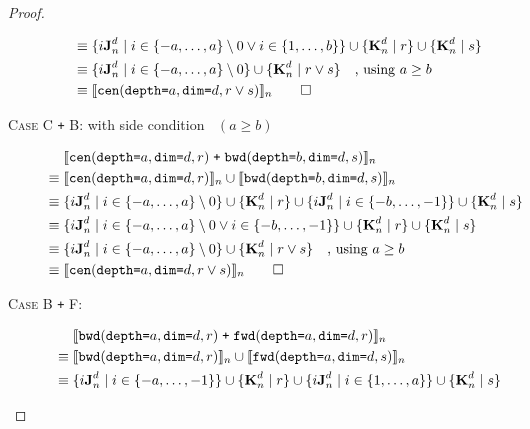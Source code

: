 \begin{proof}
\begin{description}
\begin{align*}
      \equiv & \; \{i\singleEntry{d}{n} \mid i \in \{-a, \ldots, a\} \setminus 0
                    \vee i \in \{1, \ldots, b\} \} \cup
                 \{\zeroEntry{d}{n} \mid r \} \cup \{\zeroEntry{d}{n} \mid s \} \\
      \equiv & \; \{i\singleEntry{d}{n} \mid i \in \{-a, \ldots, a\}
               \setminus 0 \} \cup \{\zeroEntry{d}{n} \mid r \vee s \} \quad \text{, using }a \geq b \\
      \equiv & \; \interp{\stenCenSR{a}{d}{r \vee s}}_n \qed
    \end{align*}
  \item[\textsc{Case C \texttt{+} B}: with side condition  $\;\;(a \geq b)$]
    \begin{align*}
      & \; \interp{\stenCenSR{a}{d}{r} \; \texttt{+} \; \stenBwdSR{b}{d}{s}}_{n} \\
      \equiv & \; \interp{\stenCenSR{a}{d}{r}}_{n} \cup \interp{\stenBwdSR{b}{d}{s}}_{n} \\
      \equiv & \; \{i\singleEntry{d}{n} \mid i \in \{-a, \ldots, a\} \setminus 0 \} \cup
                  \{\zeroEntry{d}{n} \mid r \} \cup
                  \{i\singleEntry{d}{n} \mid i \in \{-b, \ldots, -1\} \} \cup
                  \{\zeroEntry{d}{n} \mid s \} \\
      \equiv & \; \{i\singleEntry{d}{n} \mid i \in \{-a, \ldots, a\} \setminus 0
                    \vee i \in \{-b, \ldots, -1\} \} \cup
                 \{\zeroEntry{d}{n} \mid r \} \cup \{\zeroEntry{d}{n} \mid s \} \\
      \equiv & \; \{i\singleEntry{d}{n} \mid i \in \{-a, \ldots, a\}
               \setminus 0 \} \cup \{ \zeroEntry{d}{n} \mid r \vee s \} \quad \text{, using }a \geq b \\
      \equiv & \; \interp{\stenCenSR{a}{d}{r \vee s}}_n \qed
    \end{align*}
  \item[\textsc{Case B \texttt{+} F}:]
    \begin{align*}
      & \; \interp{\stenBwdSR{a}{d}{r} \; \texttt{+} \; \stenFwdSR{a}{d}{r}}_{n} \\
      \equiv & \; \interp{\stenBwdSR{a}{d}{r}}_{n} \cup \interp{\stenFwdSR{a}{d}{s}}_{n} \\
      \equiv & \; \{i\singleEntry{d}{n} \mid i \in \{-a, \ldots, -1\} \} \cup
                  \{\zeroEntry{d}{n} \mid r \} \cup
                  \{i\singleEntry{d}{n} \mid i \in \{1, \ldots, a\} \} \cup
                  \{\zeroEntry{d}{n} \mid s \} \\

\end{align*}
\end{description}
\end{proof}
